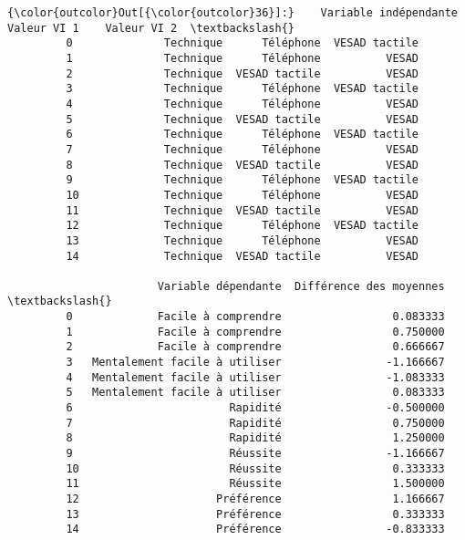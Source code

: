 \documentclass[letterpaper, 11pt]{article}
\begin{document}
\begin{Verbatim}[commandchars=\\\{\}]
{\color{outcolor}Out[{\color{outcolor}36}]:}    Variable indépendante    Valeur VI 1    Valeur VI 2  \textbackslash{}
         0              Technique      Téléphone  VESAD tactile   
         1              Technique      Téléphone          VESAD   
         2              Technique  VESAD tactile          VESAD   
         3              Technique      Téléphone  VESAD tactile   
         4              Technique      Téléphone          VESAD   
         5              Technique  VESAD tactile          VESAD   
         6              Technique      Téléphone  VESAD tactile   
         7              Technique      Téléphone          VESAD   
         8              Technique  VESAD tactile          VESAD   
         9              Technique      Téléphone  VESAD tactile   
         10             Technique      Téléphone          VESAD   
         11             Technique  VESAD tactile          VESAD   
         12             Technique      Téléphone  VESAD tactile   
         13             Technique      Téléphone          VESAD   
         14             Technique  VESAD tactile          VESAD   
         
                       Variable dépendante  Différence des moyennes  \textbackslash{}
         0             Facile à comprendre                 0.083333   
         1             Facile à comprendre                 0.750000   
         2             Facile à comprendre                 0.666667   
         3   Mentalement facile à utiliser                -1.166667   
         4   Mentalement facile à utiliser                -1.083333   
         5   Mentalement facile à utiliser                 0.083333   
         6                        Rapidité                -0.500000   
         7                        Rapidité                 0.750000   
         8                        Rapidité                 1.250000   
         9                        Réussite                -1.166667   
         10                       Réussite                 0.333333   
         11                       Réussite                 1.500000   
         12                     Préférence                 1.166667   
         13                     Préférence                 0.333333   
         14                     Préférence                -0.833333   
         

\end{Verbatim}
\end{document}
